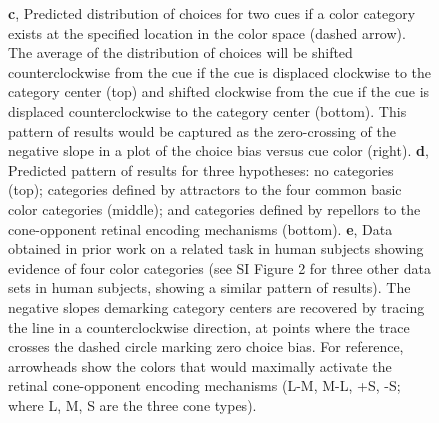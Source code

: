 \begin{figure}
\begin{fullwidth}
{	\textbf{c}, Predicted distribution of choices for two cues if a color category exists at the specified location in the color space (dashed arrow). 
	The average of the distribution of choices will be shifted counterclockwise from the cue if the cue is displaced clockwise to the category center (top) and shifted clockwise from the cue if the cue is displaced counterclockwise to the category center (bottom). This pattern of results would be captured as the zero-crossing of the negative slope in a plot of the choice bias versus cue color (right). 
	\textbf{d}, Predicted pattern of results for three hypotheses: no categories (top); categories defined by attractors to the four common basic color categories (middle); and categories defined by repellors to the cone-opponent retinal encoding mechanisms (bottom). 
	\textbf{e}, Data obtained in prior work on a related task in human subjects showing evidence of four color categories (see SI Figure 2 for three other data sets in human subjects, showing a similar pattern of results). The negative slopes demarking category centers are recovered by tracing the line in a counterclockwise direction, at points where the trace crosses the dashed circle marking zero choice bias. For reference, arrowheads show the colors that would maximally activate the retinal cone-opponent encoding mechanisms (L-M, M-L, +S, -S; where L, M, S are the three cone types).}
    \label{fig:ParadigmAnalysisPredictions}
    \end{fullwidth}
\end{figure}

